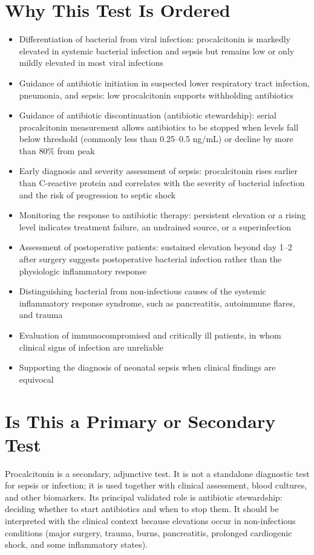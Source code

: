 \section*{Why This Test Is Ordered}
\begin{itemize}
  \item Differentiation of bacterial from viral infection: procalcitonin is markedly elevated in systemic bacterial infection and sepsis but remains low or only mildly elevated in most viral infections
  \item Guidance of antibiotic initiation in suspected lower respiratory tract infection, pneumonia, and sepsis: low procalcitonin supports withholding antibiotics
  \item Guidance of antibiotic discontinuation (antibiotic stewardship): serial procalcitonin measurement allows antibiotics to be stopped when levels fall below threshold (commonly less than 0.25--0.5 ng/mL) or decline by more than 80\% from peak
  \item Early diagnosis and severity assessment of sepsis: procalcitonin rises earlier than C-reactive protein and correlates with the severity of bacterial infection and the risk of progression to septic shock
  \item Monitoring the response to antibiotic therapy: persistent elevation or a rising level indicates treatment failure, an undrained source, or a superinfection
  \item Assessment of postoperative patients: sustained elevation beyond day 1--2 after surgery suggests postoperative bacterial infection rather than the physiologic inflammatory response
  \item Distinguishing bacterial from non-infectious causes of the systemic inflammatory response syndrome, such as pancreatitis, autoimmune flares, and trauma
  \item Evaluation of immunocompromised and critically ill patients, in whom clinical signs of infection are unreliable
  \item Supporting the diagnosis of neonatal sepsis when clinical findings are equivocal
\end{itemize}

\section*{Is This a Primary or Secondary Test}
Procalcitonin is a secondary, adjunctive test. It is not a standalone diagnostic test for sepsis or infection; it is used together with clinical assessment, blood cultures, and other biomarkers. Its principal validated role is antibiotic stewardship: deciding whether to start antibiotics and when to stop them. It should be interpreted with the clinical context because elevations occur in non-infectious conditions (major surgery, trauma, burns, pancreatitis, prolonged cardiogenic shock, and some inflammatory states).


